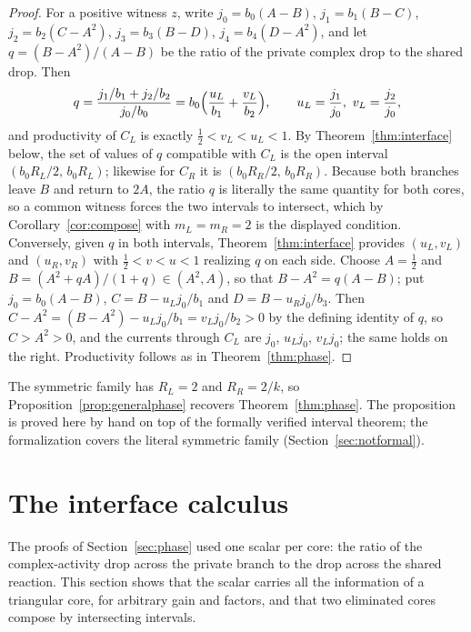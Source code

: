 \documentclass[11pt,a4paper]{article}
\theoremstyle{plain}
\theoremstyle{definition}
\theoremstyle{remark}
\begin{document}
\begin{proof}
For a positive witness $z$, write $j_0=b_0(A-B)$, $j_1=b_1(B-C)$, $j_2=b_2(C-A^2)$, $j_3=b_3(B-D)$, $j_4=b_4(D-A^2)$, and let $q=(B-A^2)/(A-B)$ be the ratio of the private complex drop to the shared drop. Then
\[
  q=\frac{j_1/b_1+j_2/b_2}{j_0/b_0}=b_0\Bigl(\frac{u_L}{b_1}+\frac{v_L}{b_2}\Bigr),\qquad u_L=\frac{j_1}{j_0},\ v_L=\frac{j_2}{j_0},
\]
and productivity of $C_L$ is exactly $\tfrac12<v_L<u_L<1$. By Theorem~\ref{thm:interface} below, the set of values of $q$ compatible with $C_L$ is the open interval $(b_0R_L/2,\,b_0R_L)$; likewise for $C_R$ it is $(b_0R_R/2,\,b_0R_R)$. Because both branches leave $B$ and return to $2A$, the ratio $q$ is literally the same quantity for both cores, so a common witness forces the two intervals to intersect, which by Corollary~\ref{cor:compose} with $m_L=m_R=2$ is the displayed condition. Conversely, given $q$ in both intervals, Theorem~\ref{thm:interface} provides $(u_L,v_L)$ and $(u_R,v_R)$ with $\tfrac12<v<u<1$ realizing $q$ on each side. Choose $A=\tfrac12$ and $B=(A^2+qA)/(1+q)\in(A^2,A)$, so that $B-A^2=q(A-B)$; put $j_0=b_0(A-B)$, $C=B-u_Lj_0/b_1$ and $D=B-u_Rj_0/b_3$. Then $C-A^2=(B-A^2)-u_Lj_0/b_1=v_Lj_0/b_2>0$ by the defining identity of $q$, so $C>A^2>0$, and the currents through $C_L$ are $j_0$, $u_Lj_0$, $v_Lj_0$; the same holds on the right. Productivity follows as in Theorem~\ref{thm:phase}.
\end{proof}

The symmetric family has $R_L=2$ and $R_R=2/k$, so Proposition~\ref{prop:generalphase} recovers Theorem~\ref{thm:phase}. The proposition is proved here by hand on top of the formally verified interval theorem; the formalization covers the literal symmetric family (Section~\ref{sec:notformal}).

\section{The interface calculus}\label{sec:interface}

The proofs of Section~\ref{sec:phase} used one scalar per core: the ratio of the complex-activity drop across the private branch to the drop across the shared reaction. This section shows that the scalar carries all the information of a triangular core, for arbitrary gain and factors, and that two eliminated cores compose by intersecting intervals.
\end{document}

